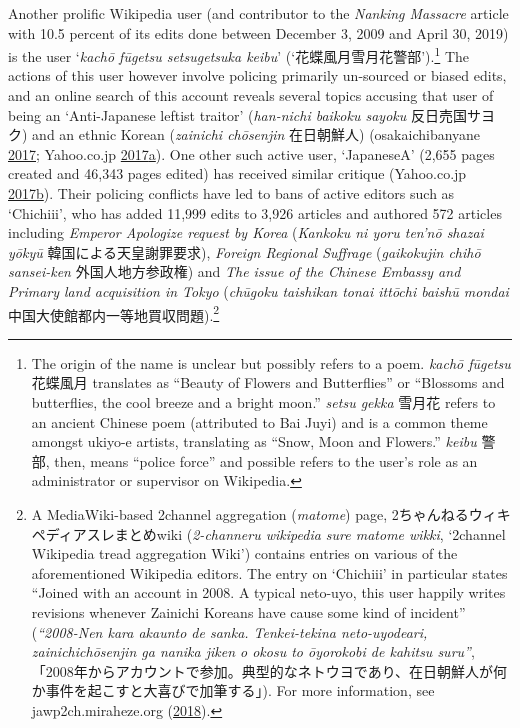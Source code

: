 \documentclass[10pt,british,A4paper,twoside]{memoir}
\begin{document}
Another prolific Wikipedia user (and contributor to the \emph{Nanking
Massacre} article with 10.5 percent of its edits done between December
3, 2009 and April 30, 2019) is the user `\emph{kachō fūgetsu
setsugetsuka keibu}' (`花蝶風月雪月花警部').\footnote{The origin of the
  name is unclear but possibly refers to a poem. \emph{kachō fūgetsu}
  花蝶風月 translates as  ``Beauty of Flowers and Butterflies'' or ``Blossoms and butterflies,
  the cool breeze and a bright moon.'' \emph{setsu gekka} 雪月花 refers
  to an ancient Chinese poem (attributed to Bai Juyi) and is a common
  theme amongst ukiyo-e artists, translating as ``Snow, Moon and
  Flowers.'' \emph{keibu} 警部, then, means ``police force'' and
  possible refers to the user's role as an administrator or supervisor
  on Wikipedia.} The actions of this user however involve policing
primarily un-sourced or biased edits, and an online search of this
account reveals several topics accusing that user of being an
`Anti-Japanese leftist traitor' (\emph{han-nichi baikoku sayoku}
反日売国サヨク) and an ethnic Korean (\emph{zainichi chōsenjin}
在日朝鮮人) (osakaichibanyane
\protect\hyperlink{ref-osakaichibanyane_isnt_2017}{2017}; Yahoo.co.jp
\protect\hyperlink{ref-anonymous_cant_2017}{2017}\protect\hyperlink{ref-anonymous_cant_2017}{a}).
One other such active user, `JapaneseA' (2,655 pages created and 46,343
pages edited) has received similar critique (Yahoo.co.jp
\protect\hyperlink{ref-anonymous_japanesea_2017}{2017}\protect\hyperlink{ref-anonymous_japanesea_2017}{b}).
Their policing conflicts have led to bans of active editors such as
`Chichiii', who has added 11,999 edits to 3,926 articles and authored
572 articles including \emph{Emperor Apologize request by Korea}
(\emph{Kankoku ni yoru ten'nō shazai yōkyū} 韓国による天皇謝罪要求),
\emph{Foreign Regional Suffrage} (\emph{gaikokujin chihō sansei-ken}
外国人地方参政権) and \emph{The issue of the Chinese Embassy and Primary
land acquisition in Tokyo} (\emph{chūgoku taishikan tonai ittōchi baishū
mondai} 中国大使館都内一等地買収問題).\footnote{A MediaWiki-based
  2channel aggregation (\emph{matome}) page,
  2ちゃんねるウィキペディアスレまとめwiki (\emph{2-channeru wikipedia
  sure matome wikki}, `2channel Wikipedia tread aggregation Wiki')
  contains entries on various of the aforementioned Wikipedia editors.
  The entry on `Chichiii' in particular states ``Joined with an account
  in 2008. A typical neto-uyo, this user happily writes revisions
  whenever Zainichi Koreans have cause some kind of incident''
  (\emph{``2008-Nen kara akaunto de sanka. Tenkei-tekina neto-uyodeari,
  zainichichōsenjin ga nanika jiken o okosu to ōyorokobi de kahitsu
  suru''},
  「2008年からアカウントで参加。典型的なネトウヨであり、在日朝鮮人が何か事件を起こすと大喜びで加筆する」).
  For more information, see jawp2ch.miraheze.org
  (\protect\hyperlink{ref-anonymous_chichiii_2018}{2018}).}
\end{document}

